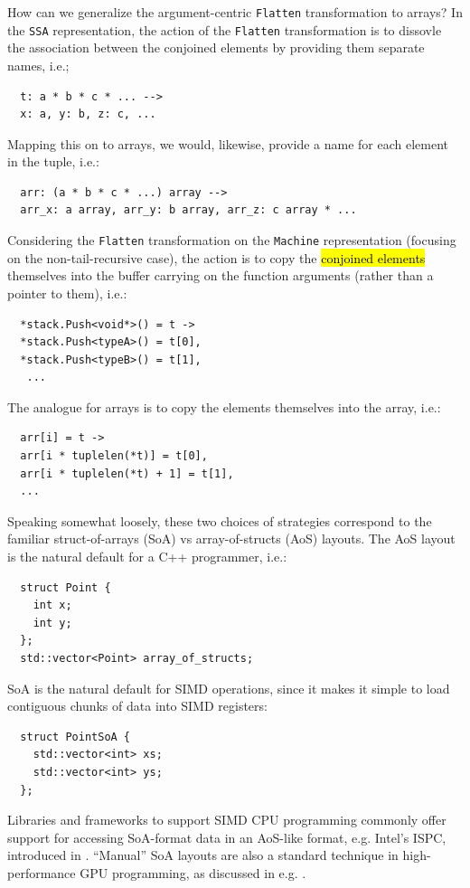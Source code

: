 \documentclass[leqno,11pt]{article}
\begin{document}
How can we generalize the argument-centric \texttt{Flatten} transformation to
arrays? In the \texttt{SSA} representation, the action of the \texttt{Flatten}
transformation is to dissovle the association between the conjoined elements by
providing them separate names, i.e.;
\begin{verbatim}
  t: a * b * c * ... -->
  x: a, y: b, z: c, ...
\end{verbatim}
Mapping this on to arrays, we would, likewise, provide a name for each element
in the tuple, i.e.:
\begin{verbatim}
  arr: (a * b * c * ...) array -->
  arr_x: a array, arr_y: b array, arr_z: c array * ...
\end{verbatim}
Considering the \texttt{Flatten} transformation on the \texttt{Machine}
representation (focusing on the non-tail-recursive case), the action is to copy
the \hl{conjoined elements} themselves into the buffer carrying on the function
arguments (rather than a pointer to them), i.e.:
\begin{verbatim}
  *stack.Push<void*>() = t ->
  *stack.Push<typeA>() = t[0], 
  *stack.Push<typeB>() = t[1],
   ...
\end{verbatim}
The analogue for arrays is to copy the elements themselves into the array, i.e.:
\begin{verbatim}
  arr[i] = t ->
  arr[i * tuplelen(*t)] = t[0],
  arr[i * tuplelen(*t) + 1] = t[1],
  ...
\end{verbatim}
Speaking somewhat loosely, these two choices of strategies correspond to the
familiar struct-of-arrays (SoA) vs array-of-structs (AoS) layouts. The AoS
layout is the natural default for a C++ programmer, i.e.:
\begin{verbatim}
  struct Point {
    int x;
    int y;
  };
  std::vector<Point> array_of_structs;
\end{verbatim}
SoA is the natural default for SIMD operations, since it makes it simple to load
contiguous chunks of data into SIMD registers:
\begin{verbatim}
  struct PointSoA {
    std::vector<int> xs;
    std::vector<int> ys;
  };
\end{verbatim}
Libraries and frameworks to support SIMD CPU programming commonly offer support
for accessing SoA-format data in an AoS-like format, e.g. Intel's ISPC,
introduced in \cite{ispc-paper}. ``Manual'' SoA layouts are also a standard
technique in high-performance GPU programming, as discussed in e.g.
\cite{cuda-textbook}.
\end{document}
